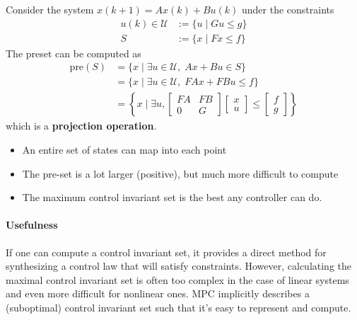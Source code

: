 Consider the system $x(k + 1) = A x(k) + B u(k)$ under the constraints
\begin{align*}
    u(k) \in \mathcal{U} & := \{u \mid G u \leq g \} \\
    S                    & := \{x \mid F x \leq f \}
\end{align*}
The preset can be computed as
\begin{align*}
    \text{pre}(S) & = \{x \mid \exists u \in \mathcal{U}, \; Ax + Bu \in S \}                                                                                                            \\
                  & = \{x \mid \exists u \in \mathcal{U}, \; F A x + F B u \leq f \}                                                                                                     \\
                  & = \left\{ x \mid \exists u, \begin{bmatrix} F A & F B \\ 0 & G \end{bmatrix} \begin{bmatrix} x \\ u \end{bmatrix} \leq \begin{bmatrix} f \\ g \end{bmatrix} \right\}
\end{align*}
which is a \textbf{projection operation}.

\newpar{}

\begin{itemize}
    \item An entire set of states can map into each point
    \item The pre-set is a lot larger (positive), but much more difficult to compute
    \item The maximum control invariant set is the best any controller can do.
\end{itemize}

\paragraph{Usefulness}

If one can compute a control invariant set, it provides a direct method for synthesizing a control law that will satisfy constraints. However, calculating the maximal control invariant set is often too complex in the case of linear systems and even more difficult for nonlinear ones. MPC implicitly describes a (suboptimal) control invariant set such that it's easy to represent and compute.

